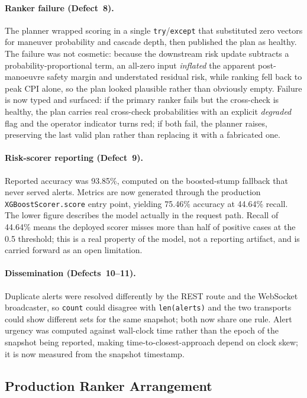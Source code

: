 \documentclass[conference]{IEEEtran}
\begin{document}
\paragraph{Ranker failure (Defect~8).}
The planner wrapped scoring in a single \texttt{try}/\texttt{except} that
substituted zero vectors for maneuver probability and cascade depth, then
published the plan as healthy. The failure was not cosmetic: because the
downstream risk update subtracts a probability-proportional term, an all-zero
input \emph{inflated} the apparent post-manoeuvre safety margin and understated
residual risk, while ranking fell back to peak CPI alone, so the plan looked
plausible rather than obviously empty. Failure is now typed and surfaced: if the
primary ranker fails but the cross-check is healthy, the plan carries real
cross-check probabilities with an explicit \emph{degraded} flag and the operator
indicator turns red; if both fail, the planner raises, preserving the last valid
plan rather than replacing it with a fabricated one.

\paragraph{Risk-scorer reporting (Defect~9).}
Reported accuracy was 93.85\%, computed on the boosted-stump fallback that never
served alerts. Metrics are now generated through the production
\texttt{XGBoostScorer.score} entry point, yielding 75.46\% accuracy at 44.64\%
recall. The lower figure describes the model actually in the request path. Recall
of 44.64\% means the deployed scorer misses more than half of positive cases at
the 0.5 threshold; this is a real property of the model, not a reporting artifact,
and is carried forward as an open limitation.

\paragraph{Dissemination (Defects~10--11).}
Duplicate alerts were resolved differently by the REST route and the WebSocket
broadcaster, so \texttt{count} could disagree with \texttt{len(alerts)} and the
two transports could show different sets for the same snapshot; both now share one
rule. Alert urgency was computed against wall-clock time rather than the epoch of
the snapshot being reported, making time-to-closest-approach depend on clock skew;
it is now measured from the snapshot timestamp.

\subsection{Production Ranker Arrangement}
\end{document}
